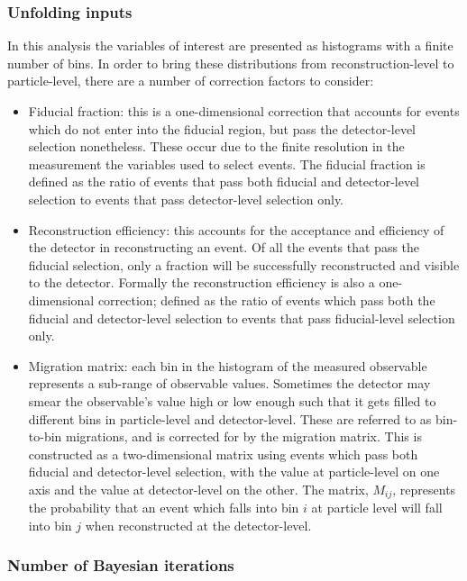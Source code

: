 \subsubsection{Unfolding inputs}

In this analysis the variables of interest are presented as histograms with a finite number of bins. In order to bring these distributions from reconstruction-level to particle-level, there are a number of correction factors to consider:

\begin{itemize}
    \item Fiducial fraction: this is a one-dimensional correction that accounts for events which do not enter into the fiducial region, but pass the detector-level selection nonetheless. These occur due to the finite resolution in the measurement the variables used to select events. The fiducial fraction is defined as the ratio of events that pass both fiducial and detector-level selection to events that pass detector-level selection only.
    \item Reconstruction efficiency: this accounts for the acceptance and efficiency of the detector in reconstructing an event. Of all the events that pass the fiducial selection, only a fraction will be successfully reconstructed and visible to the detector. Formally the reconstruction efficiency is also a one-dimensional correction; defined as the ratio of events which pass both the fiducial and detector-level selection to events that pass fiducial-level selection only.
    \item Migration matrix: each bin in the histogram of the measured observable represents a sub-range of observable values. Sometimes the detector may smear the observable's value high or low enough such that it gets filled to different bins in particle-level and detector-level. These are referred to as bin-to-bin migrations, and is corrected for by the migration matrix. This is constructed as a two-dimensional matrix using events which pass both fiducial and detector-level selection, with the value at particle-level on one axis and the value at detector-level on the other. The matrix, $M_{ij}$, represents the probability that an event which falls into bin $i$ at particle level will fall into bin $j$ when reconstructed at the detector-level. 
\end{itemize}

\subsubsection{Number of Bayesian iterations}


